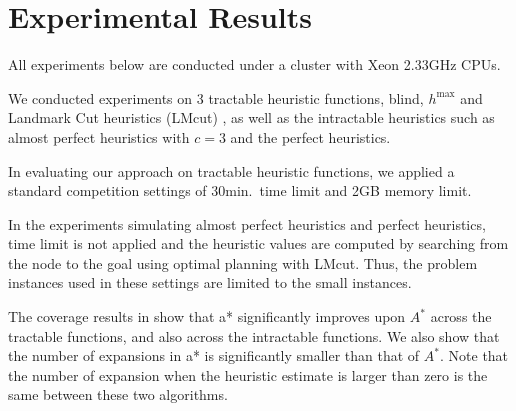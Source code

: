 \section{Experimental Results}
\label{sec-3}

All experiments below are conducted under a cluster with Xeon 2.33GHz CPUs.

We conducted experiments on 3 tractable heuristic functions, blind, $h^{\mbox{max}}$ and Landmark Cut heuristics (LMcut) \cite{Helmert2009}, as well as the intractable heuristics such as almost perfect heuristics with $c=3$ and the perfect heuristics.

In evaluating our approach on tractable heuristic functions, we applied a standard competition settings of 30min.\ time limit and 2GB memory limit.

In the experiments simulating almost perfect heuristics and perfect
heuristics, time limit is not applied and the heuristic values are computed by searching
from the node to the goal using optimal planning with LMcut. Thus, the
problem instances used in these settings are limited to the small instances.


The coverage results in  show that \*a* significantly improves upon $A^*$ across the tractable functions, and also across the intractable functions. We also show that the number of expansions in \*a* is significantly smaller than that of $A^*$. Note that the number of expansion when the heuristic estimate is larger than zero is the same between these two algorithms.

